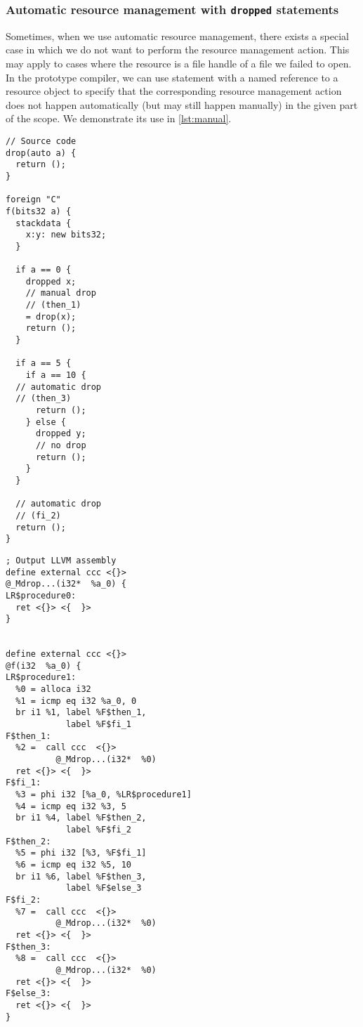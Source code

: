 \subsubsection{Automatic resource management with \texttt{dropped} statements}

Sometimes, when we use automatic resource management, there exists a special case in which we do not want to perform the resource management action. This may apply to cases where the resource is a file handle of a file we failed to open. In the prototype compiler, we can use  statement with a named reference to a resource object to specify that the corresponding resource management action does not happen automatically (but may still happen manually) in the given part of the scope. We demonstrate its use in \cref{lst:manual}.


\begin{codex}
    \small
    \caption{Example use of automatic resource management with  statements (some names are truncated for brevity)}
    \label{lst:manual}
    \begin{center}
    \begin{minipage}{0.35\linewidth}
    \begin{lstlisting}
// Source code
drop(auto a) {
  return ();
}

foreign "C"
f(bits32 a) {
  stackdata {
    x:y: new bits32;
  }

  if a == 0 {
    dropped x;
    // manual drop
    // (then_1)
    = drop(x);
    return ();
  }

  if a == 5 {
    if a == 10 {
  // automatic drop
  // (then_3)
      return ();
    } else {
      dropped y;
      // no drop
      return ();
    }
  }

  // automatic drop
  // (fi_2)
  return ();
}
    \end{lstlisting}
    \end{minipage}%
    \begin{minipage}{0.65\linewidth}
    \begin{lstlisting}[style=llvmStyle]
; Output LLVM assembly
define external ccc <{}>
@_Mdrop...(i32*  %a_0) {
LR$procedure0:
  ret <{}> <{  }>
}


define external ccc <{}>
@f(i32  %a_0) {
LR$procedure1:
  %0 = alloca i32
  %1 = icmp eq i32 %a_0, 0
  br i1 %1, label %F$then_1,
            label %F$fi_1
F$then_1:
  %2 =  call ccc  <{}>
          @_Mdrop...(i32*  %0)
  ret <{}> <{  }>
F$fi_1:
  %3 = phi i32 [%a_0, %LR$procedure1]
  %4 = icmp eq i32 %3, 5
  br i1 %4, label %F$then_2,
            label %F$fi_2
F$then_2:
  %5 = phi i32 [%3, %F$fi_1]
  %6 = icmp eq i32 %5, 10
  br i1 %6, label %F$then_3,
            label %F$else_3
F$fi_2:
  %7 =  call ccc  <{}>
          @_Mdrop...(i32*  %0)
  ret <{}> <{  }>
F$then_3:
  %8 =  call ccc  <{}>
          @_Mdrop...(i32*  %0)
  ret <{}> <{  }>
F$else_3:
  ret <{}> <{  }>
}
    \end{lstlisting}
    \end{minipage}
    \end{center}
\end{codex}

